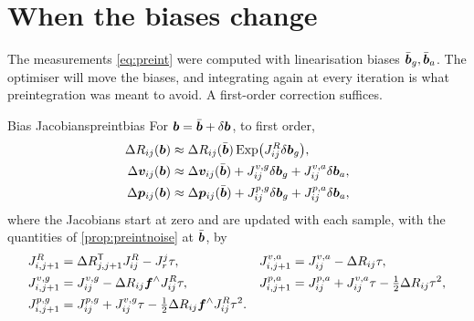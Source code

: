 \section{When the biases change}

The measurements \eqref{eq:preint} were computed with linearisation
biases $\bar{\bm{b}}_g,\bar{\bm{b}}_a$. The optimiser will move the
biases, and integrating again at every iteration is what preintegration
was meant to avoid. A first-order correction suffices.

\begin{proposition}{Bias Jacobians}{preintbias}
For $\bm{b}=\bar{\bm{b}}+\delta\bm{b}$, to first order,
\begin{equation}\label{eq:biasupd}
\begin{aligned}
\Delta R_{ij}(\bm{b})&\approx\Delta R_{ij}(\bar{\bm{b}})\operatorname{Exp}\bigl(
J^R_{ij}\delta\bm{b}_g\bigr),\\
\Delta\bm{v}_{ij}(\bm{b})&\approx\Delta\bm{v}_{ij}(\bar{\bm{b}})+
J^{v,g}_{ij}\delta\bm{b}_g+J^{v,a}_{ij}\delta\bm{b}_a,\\
\Delta\bm{p}_{ij}(\bm{b})&\approx\Delta\bm{p}_{ij}(\bar{\bm{b}})+
J^{p,g}_{ij}\delta\bm{b}_g+J^{p,a}_{ij}\delta\bm{b}_a,
\end{aligned}
\end{equation}
where the Jacobians start at zero and are updated with each sample, with
the quantities of \cref{prop:preintnoise} at $\bar{\bm{b}}$, by
\begin{equation}\label{eq:biasrec}
\begin{aligned}
J^R_{i,j+1}&=\Delta R_{j,j+1}^{\mathsf{T}} J^R_{ij}-J_r^j\tau,&
J^{v,a}_{i,j+1}&=J^{v,a}_{ij}-\Delta R_{ij}\tau,\\
J^{v,g}_{i,j+1}&=J^{v,g}_{ij}-\Delta R_{ij}\bm{f}^{\wedge}J^R_{ij}\tau,&
J^{p,a}_{i,j+1}&=J^{p,a}_{ij}+J^{v,a}_{ij}\tau-\tfrac12\Delta R_{ij}\tau^2,
\\
J^{p,g}_{i,j+1}&=J^{p,g}_{ij}+J^{v,g}_{ij}\tau-\tfrac12\Delta R_{ij}
\bm{f}^{\wedge}J^R_{ij}\tau^2 .
\end{aligned}
\end{equation}
\end{proposition}

